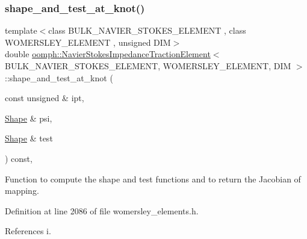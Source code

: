 \subsubsection{\texorpdfstring{shape\+\_\+and\+\_\+test\+\_\+at\+\_\+knot()}{shape\_and\_test\_at\_knot()}}
{\footnotesize\ttfamily template$<$class B\+U\+L\+K\+\_\+\+N\+A\+V\+I\+E\+R\+\_\+\+S\+T\+O\+K\+E\+S\+\_\+\+E\+L\+E\+M\+E\+NT , class W\+O\+M\+E\+R\+S\+L\+E\+Y\+\_\+\+E\+L\+E\+M\+E\+NT , unsigned D\+IM$>$ \\
double \hyperlink{classoomph_1_1NavierStokesImpedanceTractionElement}{oomph\+::\+Navier\+Stokes\+Impedance\+Traction\+Element}$<$ B\+U\+L\+K\+\_\+\+N\+A\+V\+I\+E\+R\+\_\+\+S\+T\+O\+K\+E\+S\+\_\+\+E\+L\+E\+M\+E\+NT, W\+O\+M\+E\+R\+S\+L\+E\+Y\+\_\+\+E\+L\+E\+M\+E\+NT, D\+IM $>$\+::shape\+\_\+and\+\_\+test\+\_\+at\+\_\+knot (\begin{DoxyParamCaption}\item[{const unsigned \&}]{ipt,  }\item[{\hyperlink{classoomph_1_1Shape}{Shape} \&}]{psi,  }\item[{\hyperlink{classoomph_1_1Shape}{Shape} \&}]{test }\end{DoxyParamCaption}) const\hspace{0.3cm}{\ttfamily [inline]}, {\ttfamily [protected]}}



Function to compute the shape and test functions and to return the Jacobian of mapping. 



Definition at line 2086 of file womersley\+\_\+elements.\+h.



References i.

\mbox{\label{classoomph_1_1NavierStokesImpedanceTractionElement_ade2eae5b0a6ecac82949f05a073217ea}} 
